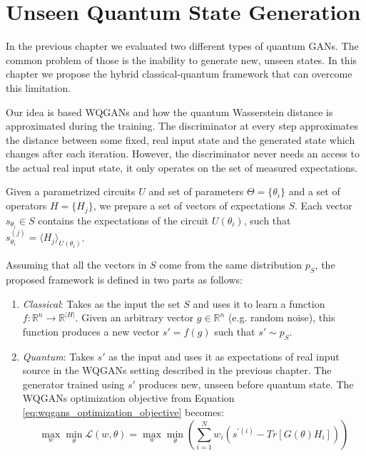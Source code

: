 \chapter{Unseen Quantum State Generation}
\label{chapter:my_contribution}
In the previous chapter we evaluated two different types of quantum GANs. The
common problem of those is the inability to generate new, unseen states. In this
chapter we propose the hybrid classical-quantum framework that can overcome this limitation. 

Our idea is based WQGANs and how the quantum Wasserstein distance is
approximated during the training. The discriminator at every step approximates
the distance between some fixed, real input state and the generated state which
changes after each iteration. However, the discriminator never needs an access to
the actual real input state, it only operates on the set of measured
expectations. 

Given a parametrized circuits $U$
and set of parameters $\Theta = \{\theta_i\}$ and a set of operators $H =
\{H_j\}$, we prepare a set of vectors of expectations $S$. Each vector $s_{\theta_i}
\in S$ contains the expectations of the circuit $U(\theta_i)$, such that
$s_{\theta_i}^{(j)} = \langle H_j \rangle_{U(\theta_i)} $.

Assuming that all the vectors in $S$ come from the same distribution $p_S$,
the proposed framework is defined in two parts as follows:
\begin{enumerate}
\item \textit{Classical}: Takes as the input the set $S$ and uses it to learn a function $f:
  \mathbb{R}^{n} \to \mathbb{R}^{|H|}$. Given an arbitrary vector $g \in
  \mathbb{R}^n$ (e.g. random noise), this function produces a new vector $s' =
  f(g)$ such that $s' \sim p_S$.  
\item \textit{Quantum}: Takes $s'$ as the input and uses it as
  expectations of real input source in the WQGANs setting described in the
  previous chapter. The generator trained using $s'$ produces new, unseen before
  quantum state. The WQGANs optimization objective from Equation
  \ref{eq:wqgans_optimization_objective} becomes:
  \begin{equation}
    \max_{w}{\min_{\theta}{\mathcal{L}(w, \theta)}} = \max_{w}{\min_{\theta}{(\sum_{i=1}^Nw_i(s^{\prime(i)} - Tr[G(\theta)H_i]))}} 
    \label{eq:wqgans_optimization_objective_unseen}
  \end{equation}
\end{enumerate}

